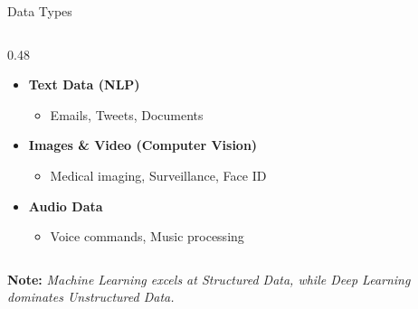 \begin{frame}{Data Types}
\begin{columns}[T]
\begin{column}{0.48\textwidth}
            \begin{itemize}
                \setlength\itemsep{0.8em}
                \item \textbf{Text Data (NLP)}
                \begin{itemize}
                    \item Emails, Tweets, Documents
                \end{itemize}
                \item \textbf{Images \& Video (Computer Vision)}
                \begin{itemize}
                    \item Medical imaging, Surveillance, Face ID
                \end{itemize}
                \item \textbf{Audio Data}
                \begin{itemize}
                    \item Voice commands, Music processing
                \end{itemize}
            \end{itemize}
        \end{column}
    \end{columns}
    \textbf{Note:} \textit{Machine Learning excels at Structured Data, while Deep Learning dominates Unstructured Data.}
\end{frame}

